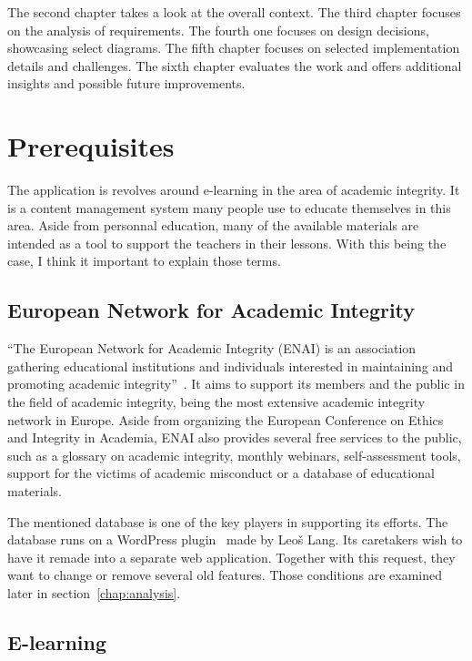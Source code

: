 \documentclass[
  digital,     %
  oneside,     %
  nosansbold,  %
  colorbold, %
  lof,         %
  lot,         %
]{fithesis4}
\begin{document}
The second chapter takes a look at the overall context. The third chapter
focuses on the analysis of requirements. The fourth one focuses on design decisions,
showcasing select diagrams. The fifth chapter focuses on selected implementation
details and challenges. The sixth chapter evaluates the work and offers
additional insights and possible future improvements.

\chapter{Prerequisites}

The application is revolves around e-learning in the area of academic integrity.
It is a content management system many people use to educate themselves in this area.
Aside from personnal education, many of the available materials are intended as a tool
to support the teachers in their lessons. With this being the case, I think it important to
explain those terms.

\section{European Network for Academic Integrity}

“The European Network for Academic Integrity (ENAI) is an association gathering
educational institutions and individuals interested in maintaining and promoting
academic integrity”~\cite{enai_about}. It aims to support its members and
the public in the field of academic integrity, being the most extensive academic
integrity network in Europe. Aside from organizing the European Conference on Ethics
and Integrity in Academia, ENAI also provides several free services to the public,
such as a glossary on academic integrity, monthly webinars, self-assessment tools,
support for the victims of academic misconduct or a database of educational materials.

The mentioned database is one of the key players in supporting its efforts.
The database runs on a WordPress plugin~\cite{lang18} made by Leoš Lang.
Its caretakers wish to have it remade into a separate web application. Together
with this request, they want to change or remove several old features. Those
conditions are examined later in section~\ref{chap:analysis}.

\section{E-learning}
\end{document}

